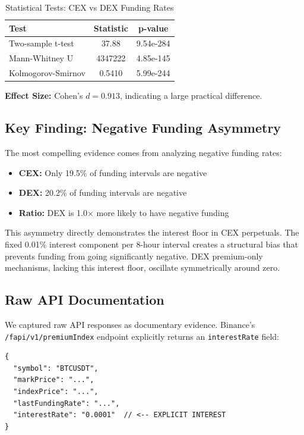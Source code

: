 \begin{table}[h]
\centering
\caption{Statistical Tests: CEX vs DEX Funding Rates}
\label{tab:stats_tests}
\begin{tabular}{@{}lcc@{}}
\toprule
\textbf{Test} & \textbf{Statistic} & \textbf{p-value} \\
\midrule
Two-sample t-test & 37.88 & 9.54e-284 \\
Mann-Whitney U & 4347222 & 4.85e-145 \\
Kolmogorov-Smirnov & 0.5410 & 5.99e-244 \\
\bottomrule
\end{tabular}
\end{table}

\textbf{Effect Size:} Cohen's $d = 0.913$, indicating a large practical difference.

\subsection{Key Finding: Negative Funding Asymmetry}

The most compelling evidence comes from analyzing negative funding rates:

\begin{itemize}
    \item \textbf{CEX:} Only 19.5\% of funding intervals are negative
    \item \textbf{DEX:} 20.2\% of funding intervals are negative
    \item \textbf{Ratio:} DEX is 1.0$\times$ more likely to have negative funding
\end{itemize}

This asymmetry directly demonstrates the interest floor in CEX perpetuals. The fixed 0.01\% interest component per 8-hour interval creates a structural bias that prevents funding from going significantly negative. DEX premium-only mechanisms, lacking this interest floor, oscillate symmetrically around zero.

\subsection{Raw API Documentation}

We captured raw API responses as documentary evidence. Binance's \texttt{/fapi/v1/premiumIndex} endpoint explicitly returns an \texttt{interestRate} field:

\begin{verbatim}
{
  "symbol": "BTCUSDT",
  "markPrice": "...",
  "indexPrice": "...",
  "lastFundingRate": "...",
  "interestRate": "0.0001"  // <-- EXPLICIT INTEREST
}
\end{verbatim}

